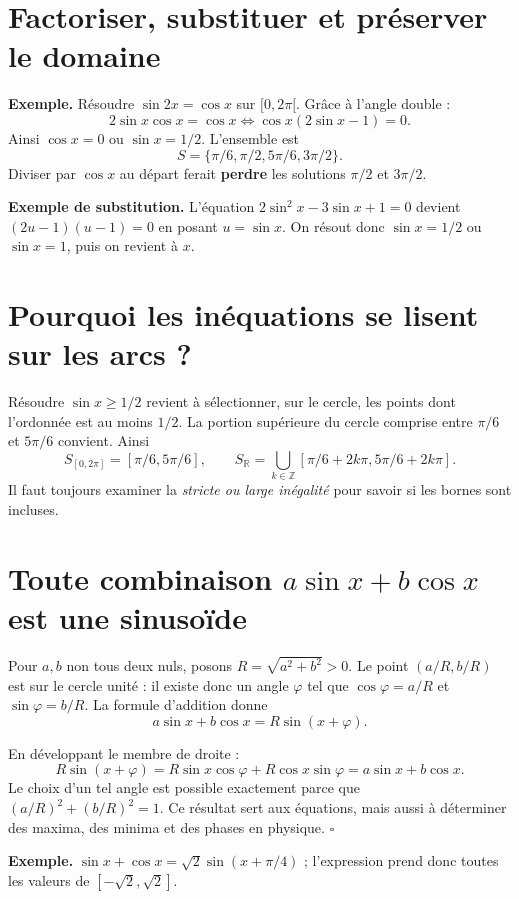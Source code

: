 \documentclass[../cours_spe_trigo.tex]{subfiles}
\begin{document}
\section{Factoriser, substituer et préserver le domaine}
\begin{methode}
\textbf{Exemple.} Résoudre $\sin2x=\cos x$ sur $[0,2\pi[$. Grâce à l'angle double :
\[
2\sin x\cos x=\cos x\iff\cos x(2\sin x-1)=0.
\]
Ainsi $\cos x=0$ ou $\sin x=1/2$. L'ensemble est
\[\boxed{S=\{\pi/6,\pi/2,5\pi/6,3\pi/2\}.}\]
Diviser par $\cos x$ au départ ferait \textbf{perdre} les solutions $\pi/2$ et $3\pi/2$.
\end{methode}
\textbf{Exemple de substitution.} L'équation $2\sin^2x-3\sin x+1=0$ devient $(2u-1)(u-1)=0$ en posant $u=\sin x$. On résout donc $\sin x=1/2$ ou $\sin x=1$, puis on revient à $x$.

\section{Pourquoi les inéquations se lisent sur les arcs ?}
Résoudre $\sin x\ge1/2$ revient à sélectionner, sur le cercle, les points dont l'ordonnée est au moins $1/2$. La portion supérieure du cercle comprise entre $\pi/6$ et $5\pi/6$ convient. Ainsi
\[
\boxed{S_{[0,2\pi]}=[\pi/6,5\pi/6],\qquad
S_{\mathbb R}=\bigcup_{k\in\mathbb Z}[\pi/6+2k\pi,5\pi/6+2k\pi].}
\]
Il faut toujours examiner la \emph{stricte ou large inégalité} pour savoir si les bornes sont incluses.

\section{Toute combinaison $a\sin x+b\cos x$ est une sinusoïde}
Pour $a,b$ non tous deux nuls, posons $R=\sqrt{a^2+b^2}>0$. Le point $(a/R,b/R)$ est sur le cercle unité : il existe donc un angle $\varphi$ tel que $\cos\varphi=a/R$ et $\sin\varphi=b/R$. La formule d'addition donne
\[
\boxed{a\sin x+b\cos x=R\sin(x+\varphi).}
\]
\begin{demonstration}
En développant le membre de droite :
\[
R\sin(x+\varphi)=R\sin x\cos\varphi+R\cos x\sin\varphi
=a\sin x+b\cos x.
\]
Le choix d'un tel angle est possible exactement parce que $(a/R)^2+(b/R)^2=1$. Ce résultat sert aux équations, mais aussi à déterminer des maxima, des minima et des phases en physique. $\square$
\end{demonstration}
\textbf{Exemple.} $\sin x+\cos x=\sqrt2\sin(x+\pi/4)$ ; l'expression prend donc toutes les valeurs de $[-\sqrt2,\sqrt2]$.
\end{document}
